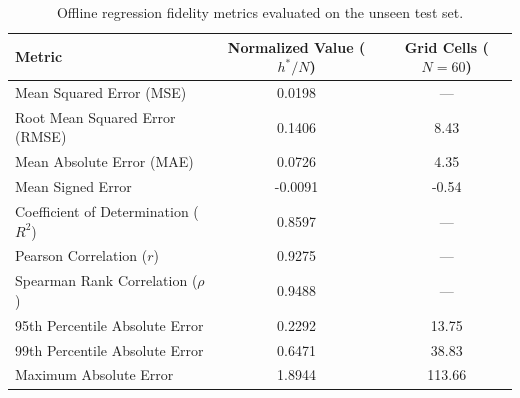 \begin{table}[H]
\centering
\small
\begin{tabular}{lcc}
\toprule
\textbf{Metric} & \textbf{Normalized Value ($h^\ast / N$)} & \textbf{Grid Cells ($N=60$)} \\
\midrule
Mean Squared Error (MSE) & 0.0198 & --- \\
Root Mean Squared Error (RMSE) & 0.1406 & 8.43 \\
Mean Absolute Error (MAE) & 0.0726 & 4.35 \\
Mean Signed Error & -0.0091 & -0.54 \\
Coefficient of Determination ($R^2$) & 0.8597 & --- \\
Pearson Correlation ($r$) & 0.9275 & --- \\
Spearman Rank Correlation ($\rho$) & 0.9488 & --- \\
95th Percentile Absolute Error & 0.2292 & 13.75 \\
99th Percentile Absolute Error & 0.6471 & 38.83 \\
Maximum Absolute Error & 1.8944 & 113.66 \\
\bottomrule
\end{tabular}
\caption{Offline regression fidelity metrics evaluated on the unseen test set.}
\label{tab:regression_results}
\end{table}
